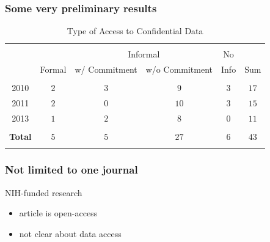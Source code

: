 \begin{frame}
	\frametitle{Some very preliminary results}
\begin{table}[!htbp] \centering 
	\caption{Type of Access to Confidential Data} 
	\label{} 
	\begin{tabular}{ cccccc} 
		\\[-1.8ex]\hline 
		\hline \\[-1.8ex] 
		&  &\multicolumn{2}{c}{Informal} & No  &  \\ 
		& Formal & w/ Commitment & w/o Commitment &  Info & Sum \\ 
		\hline \\[-1.8ex] 
		2010 & $2$ & $3$ & $9$ & $3$ & $17$ \\ 
		2011 & $2$ & $0$ & $10$ & $3$ & $15$ \\ 
		2013 & $1$ & $2$ & $8$ & $0$ & $11$ \\ 
		\hline \\[-1.8ex] 
	\bf	Total & $5$ & $5$ & $27$ & $6$ & $43$ \\ 
		\hline \\[-1.8ex] 
	\end{tabular} 
\end{table} 
		\end{frame}



\begin{frame}
	\frametitle{Not limited to one journal}
	\begin{block}{NIH-funded research}
		\begin{itemize}
			\item article is open-access
			\item not clear about data access
		\end{itemize}
	\end{block}
\end{frame}

